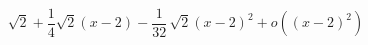 \begin{displaymath}
 \sqrt {2}+\frac{1}{4}\sqrt {2} \left( x-2 \right) -\frac{1}{32}\,\sqrt {2} \left( x
-2 \right) ^{2} +o((x-2)^2)
\end{displaymath}
